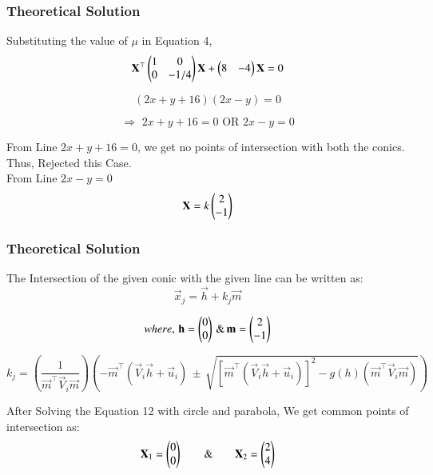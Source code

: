 \documentclass{beamer}
\begin{document}
\begin{frame}[fragile]
\frametitle{Theoretical Solution}
 Substituting the value of $\mu$ in Equation 4,
\begin{equation}
\mathbf{X}^\top\begin{pmatrix}1 & 0 \\ 0 & -1/4\end{pmatrix}\mathbf{X} + \begin{pmatrix}8 & -4\end{pmatrix}\mathbf{X} = 0
\end{equation}

\begin{equation}
    (2x+y+16)(2x-y) = 0
\end{equation}

\begin{equation}
   \Rightarrow \, \, 2x + y + 16 =0 \text{ OR } 2x-y=0
\end{equation}

From Line $2x + y + 16 =0$, we get no points of intersection with both the conics.\\
Thus, Rejected this Case.\\

From Line $2x-y=0$
\begin{equation}
    \mathbf{X} = k\begin{pmatrix}2 \\ -1\end{pmatrix} 
\end{equation}
\end{frame}

\begin{frame}[fragile]
\frametitle{Theoretical Solution}
 The Intersection of the given conic with the given line can be written as:
\begin{equation}
    \vec{x}_j = \vec{h} + k_j\vec{m}
\end{equation}

\begin{equation}
where, \, \mathbf{h} = \begin{pmatrix}0 \\ 0\end{pmatrix} \, \& \, \mathbf{m} = \begin{pmatrix}2 \\ -1\end{pmatrix}   
\end{equation}

\begin{equation}
    k_{j} = \left( \dfrac{1}{\vec{m}^\top\vec{V}_i\vec{m}} \right) \left( 
    -\vec{m}^\top(\vec{V}_i\vec{h}+\vec{u}_i) \, \pm \, \sqrt{[\vec{m}^\top(\vec{V}_i\vec{h}+\vec{u}_i)]^2 - g(h)(\vec{m}^\top\vec{V}_i\vec{m})} \right) 
\end{equation}

After Solving the Equation 12 with circle and parabola, We get common points of intersection as:
\begin{equation}
    \mathbf{X}_1 = \begin{pmatrix}0 \\ 0\end{pmatrix} \qquad \& \qquad \mathbf{X}_2 = \begin{pmatrix}2 \\ 4\end{pmatrix}
\end{equation}
\end{frame}
\end{document}

